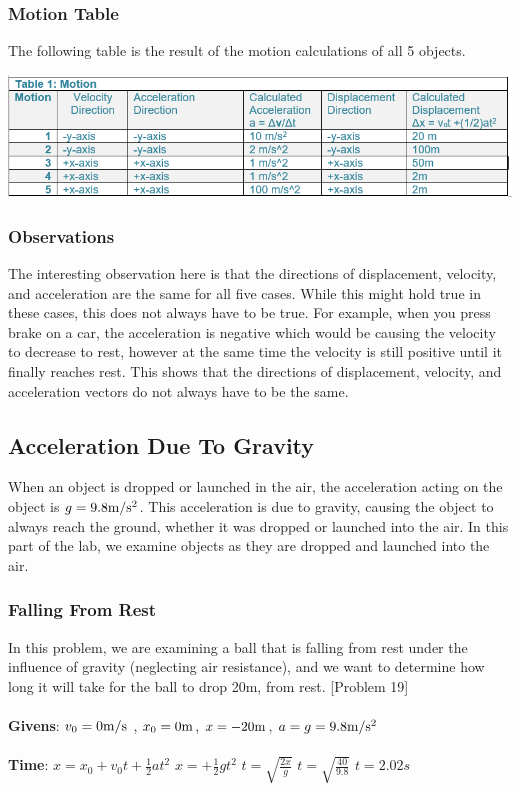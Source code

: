 \documentclass{article}
\begin{document}
\subsubsection{Motion Table}
The following table is the result of the motion calculations of all 5 objects. 
\begin{center} 
\includegraphics[scale=0.5]{motion_table1.png}
\end{center}

\subsubsection{Observations} 
The interesting observation here is that the directions of displacement, velocity, and acceleration are the same for all five cases. While this might hold true in these cases, this does not always have to be true. For example, when you press brake on a car, the acceleration is negative which would be causing the velocity to decrease to rest, however at the same time the velocity is still positive until it finally reaches rest. This shows that the directions of displacement, velocity, and acceleration vectors do not always have to be the same. 

\subsection{Acceleration Due To Gravity} 
When an object is dropped or launched in the air, the acceleration acting on the object is \(g = 9.8\si[per-mode=symbol]{\meter\per\second\squared}\). This acceleration is due to gravity, causing the object to always reach the ground, whether it was dropped or launched into the air. In this part of the lab, we examine objects as they are dropped and launched into the air.
\subsubsection{Falling From Rest}
In this problem, we are examining a ball that is falling from rest under the influence of gravity (neglecting air resistance), and we want to determine how long it will take for the ball to drop 20m, from rest. [Problem 19] \\ \\  
\textbf{Givens}: \(v_0 = 0\si[per-mode=symbol]{\meter\per\second}\) , \(x_0 = 0\si[per-mode=symbol]{\meter}\), \(x = -20\si[per-mode=symbol]{\meter}\), \(a = g = 9.8\si[per-mode=symbol]{\meter\per\second\squared}\) \\ \\ 
\textbf{Time}: \(x = x_0 + v_0t + \frac{1}{2}at^2\) \Rightarrow \(x = +\frac{1}{2}gt^2\) \Rightarrow \(t = \sqrt{\frac{2x}{g}}\) \Rightarrow \(t=\sqrt{\frac{40}{9.8}}\) \Rightarrow \(t = 2.02s\) 
\end{document}
